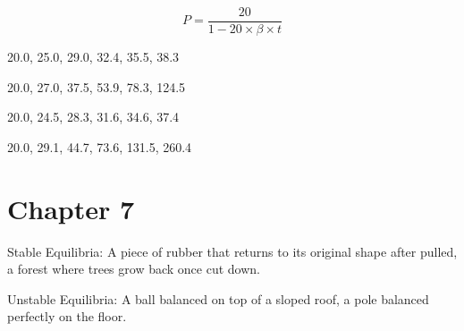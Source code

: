 \documentclass[]{memoir}
\begin{document}
\[ P = \frac{20}{1 - 20 \times \beta \times t }\]


20.0, 25.0, 29.0, 32.4, 35.5, 38.3


20.0, 27.0, 37.5, 53.9, 78.3, 124.5


20.0, 24.5, 28.3, 31.6, 34.6, 37.4


20.0, 29.1, 44.7, 73.6, 131.5, 260.4

\section{Chapter 7}


Stable Equilibria: A piece of rubber that returns to its original shape
after pulled, a forest where trees grow back once cut down.

Unstable Equilibria: A ball balanced on top of a sloped roof, a pole
balanced perfectly on the floor.

\end{document}
